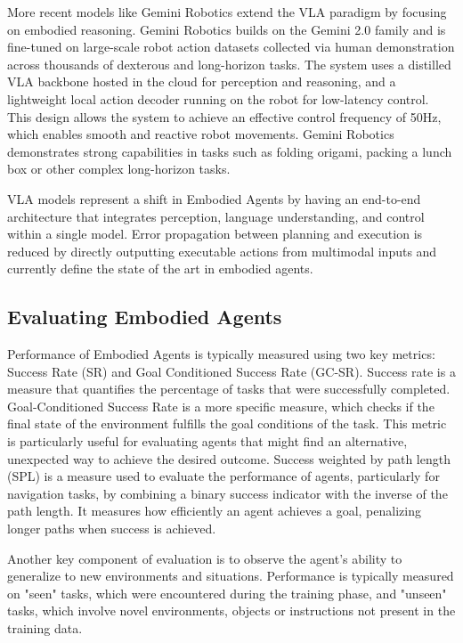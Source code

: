 \documentclass[11pt]{article}
\begin{document}
More recent models like Gemini Robotics extend the VLA paradigm by focusing on embodied reasoning. Gemini Robotics builds on the Gemini 2.0 family and is fine-tuned on large-scale robot action datasets collected via human demonstration across thousands of dexterous and long-horizon tasks. The system uses a distilled VLA backbone hosted in the cloud for perception and reasoning, and a lightweight local action decoder running on the robot for low-latency control. This design allows the system to achieve an effective control frequency of 50Hz, which enables smooth and reactive robot movements. Gemini Robotics demonstrates strong capabilities in tasks such as folding origami, packing a lunch box or other complex long-horizon tasks.

VLA models represent a shift in Embodied Agents by having an end-to-end architecture that integrates perception, language understanding, and control within a single model. Error propagation between planning and execution is reduced by directly outputting executable actions from multimodal inputs and currently define the state of the art in embodied agents.

\subsection{Evaluating Embodied Agents}
Performance of Embodied Agents is typically measured using two key metrics: Success Rate (SR) and Goal Conditioned Success Rate (GC-SR). Success rate is a measure that quantifies the percentage of tasks that were successfully completed. Goal-Conditioned Success Rate is a more specific measure, which checks if the final state of the environment fulfills the goal conditions of the task. This metric is particularly useful for evaluating agents that might find an alternative, unexpected way to achieve the desired outcome.
Success weighted by path length (SPL) is a measure used to evaluate the performance of agents, particularly for navigation tasks, by combining a binary success indicator with the inverse of the path length. It measures how efficiently an agent achieves a goal, penalizing longer paths when success is achieved.

Another key component of evaluation is to observe the agent's ability to generalize to new environments and situations. Performance is typically measured on "seen" tasks, which were encountered during the training phase, and "unseen" tasks, which involve novel environments, objects or instructions not present in the training data.
\end{document}
